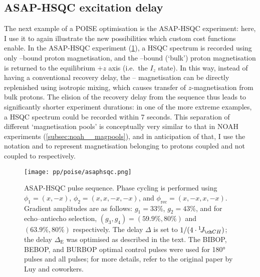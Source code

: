 \subsection{ASAP-HSQC excitation delay}
\label{subsec:poise__asaphsqc}

The next example of a POISE optimisation is the ASAP-HSQC experiment\autocite{SchulzeSunninghausen2014JACS,SchulzeSunninghausen2017JMR}: here, I use it to again illustrate the new possibilities which custom cost functions enable.
In the ASAP-HSQC experiment (\cref{fig:asaphsqc_pulseq}), a HSQC spectrum is recorded using only \carbon{}--bound proton magnetisation, and the \carbont{}--bound (`bulk') proton magnetisation is returned to the equilibrium $+z$ axis (i.e.\ the $I_z$ state).
In this way, instead of having a conventional recovery delay, the \carbon{}--\proton{} magnetisation can be directly replenished using isotropic mixing, which causes transfer of $z$-magnetisation from bulk protons.
The elision of the recovery delay from the sequence thus leads to significantly shorter experiment durations: in one of the more extreme examples, a HSQC spectrum could be recorded within 7 seconds.
This separation of different `magnetisation pools' is conceptually very similar to that in NOAH experiments (\cref{subsec:noah__magpools}), and in anticipation of that, I use the notation  and  to represent magnetisation belonging to protons coupled and not coupled to \carbon{} respectively.

\begin{figure}[htb]
    \centering
    \texttt{[image: pp/poise/asaphsqc.png]}%
    \caption[ASAP-HSQC pulse sequence]{
        ASAP-HSQC pulse sequence.
        Phase cycling is performed using $\phi_1 = (x, -x)$, $\phi_2 = (x, x, -x, -x)$, and $\phi_\text{rec} = (x, -x, x, -x)$.
        Gradient amplitudes are as follows: $g_1 = 33\%$, $g_2 = 43\%$, and for echo--antiecho selection, $(g_3, g_4) = (59.9\%, 80\%)$ and $(63.9\%, 80\%)$ respectively.
        The delay $\Delta$ is set to $1/(4 \cdot \oneJ{CH})$; the delay $\Delta_\text{E}$ was optimised as described in the text.
        The BIBOP, BEBOP, and BURBOP optimal control pulses\autocite{Kobzar2004JMR,Kobzar2008JMR,Kobzar2012JMR} were used for \proton{} \ang{180} pulses and all \carbon{} pulses; for more details, refer to the original paper by Luy and coworkers\autocite{SchulzeSunninghausen2014JACS}.
    }
    \label{fig:asaphsqc_pulseq}
\end{figure}

